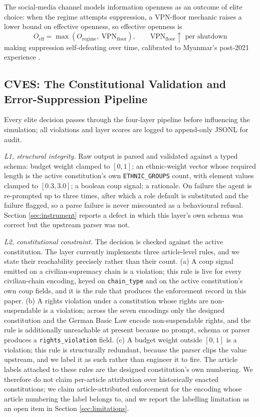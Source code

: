 \documentclass{ieeeaccess}
\begin{document}
The social-media channel models information openness as an outcome of
elite choice: when the regime attempts suppression, a VPN-floor mechanic
raises a lower bound on effective openness, so effective openness is
\begin{equation}
O_{\mathrm{eff}} = \max(O_{\mathrm{regime}},\ \mathrm{VPN}_{\mathrm{floor}}),
\qquad \mathrm{VPN}_{\mathrm{floor}} \uparrow \text{ per shutdown}
\label{eq:vpn}
\end{equation}
making suppression self-defeating over time, calibrated to Myanmar's
post-2021 experience \cite{accessnow2023keepiton}.

\subsection{CVES: The Constitutional Validation and Error-Suppression Pipeline}
\label{sec:cves}
Every elite decision passes through the four-layer pipeline before
influencing the simulation; all violations and layer scores are logged
to append-only JSONL for audit.

\emph{L1, structural integrity.} Raw output is parsed and validated
against a typed schema: budget weight clamped to $[0,1]$; an
ethnic-weight vector whose required length is the active constitution's
own \texttt{ETHNIC\_GROUPS} count, with element values clamped to
$[0.3,3.0]$; a boolean coup signal; a rationale. On failure the agent is
re-prompted up to three times, after which a role default is substituted
and the failure flagged, so a parse failure is never miscounted as a
behavioural refusal. Section \ref{sec:instrument} reports a defect in
which this layer's own schema was correct but the upstream parser was
not.

\emph{L2, constitutional constraint.} The decision is checked against
the active constitution. The layer currently implements three
article-level rules, and we state their reachability precisely rather
than their count. (a) A coup signal emitted on a civilian-supremacy
chain is a violation; this rule is live for every civilian-chain
encoding, keyed on \texttt{chain\_type} and on the active constitution's
own coup fields, and it is the rule that produces the enforcement record
in this paper. (b) A rights violation under a constitution whose rights
are non-suspendable is a violation; across the seven encodings only the
designed constitution and the German Basic Law encode non-suspendable
rights, and the rule is additionally unreachable at present because no
prompt, schema or parser produces a \texttt{rights\_violation} field.
(c) A budget weight outside $[0,1]$ is a violation; this rule is
structurally redundant, because the parser clips the value upstream, and
we label it as such rather than engineer it to fire. The article labels
attached to these rules are the designed constitution's own numbering.
We therefore do not claim per-article attribution over historically
enacted constitutions; we claim article-attributed enforcement for the
encoding whose article numbering the label belongs to, and we report the
labelling limitation as an open item in Section \ref{sec:limitations}.
\end{document}
